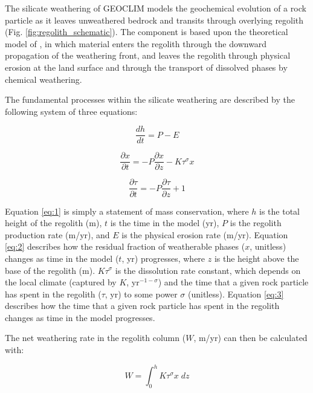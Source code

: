 \documentclass[11pt,letterpaper]{article}
\begin{document}
The silicate weathering of GEOCLIM models the geochemical evolution of a rock particle as it leaves unweathered bedrock and transits through overlying regolith (Fig. \ref{fig:regolith_schematic}). The component is based upon the theoretical model of \citet{Gabet2009a}, in which material enters the regolith through the downward propagation of the weathering front, and leaves the regolith through physical erosion at the land surface and through the transport of dissolved phases by chemical weathering.

The fundamental processes within the silicate weathering are described by the following system of three equations:

\begin{equation}
    \frac{dh}{dt} = P - E
    \label{eq:1}
\end{equation}

\begin{equation}
    \frac{\partial x}{\partial t} = -P \frac{\partial x}{\partial z} - K \tau^{\sigma}x
    \label{eq:2}
\end{equation}

\begin{equation}
    \frac{\partial \tau}{\partial t} = -P \frac{\partial \tau}{\partial z} + 1
    \label{eq:3}
\end{equation}

\noindent
Equation \ref{eq:1} is simply a statement of mass conservation, where $h$ is the total height of the regolith (m), $t$ is the time in the model (yr), $P$ is the regolith production rate (m/yr), and $E$ is the physical erosion rate (m/yr). Equation \ref{eq:2} describes how the residual fraction of weatherable phases ($x$, unitless) changes as time in the model ($t$, yr) progresses, where $z$ is the height above the base of the regolith (m). $K \tau^{\sigma}$ is the dissolution rate constant, which depends on the local climate (captured by $K$, yr$^{-1-\sigma}$) and the time that a given rock particle has spent in the regolith ($\tau$, yr) to some power $\sigma$ (unitless). Equation \ref{eq:3} describes how the time that a given rock particle has spent in the regolith changes as time in the model progresses.

The net weathering rate in the regolith column ($W$, m/yr) can then be calculated with:

\begin{equation}
    W = \int_{0}^{h} K \tau^{\sigma} x\;dz
    \label{eq:4}
\end{equation}
\end{document}
